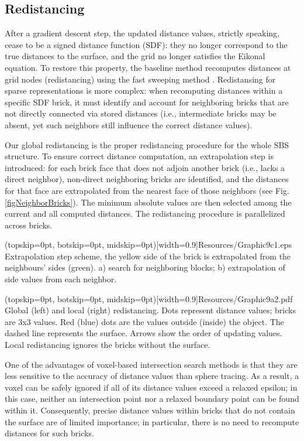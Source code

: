 \documentclass{ieeeaccess}
\begin{document}
\subsection{Redistancing}

After a gradient descent step, the updated distance values, strictly speaking, cease to be a signed distance function (SDF): they no longer correspond to the true distances to the surface, and the grid no longer satisfies the Eikonal equation. To restore this property, the baseline method recomputes distances at grid nodes (redistancing) using the fast sweeping method \cite{RedistFSM}. Redistansing for sparse representations is more complex: when recomputing distances within a specific SDF brick, it must identify and account for neighboring bricks that are not directly connected via stored distances (i.e., intermediate bricks may be absent, yet such neighbors still influence the correct distance values).

Our global redistancing is the proper redistancing procedure for the whole SBS structure. To ensure correct distance computation, an extrapolation step is introduced: for each brick face that does not adjoin another brick (i.e., lacks a direct neighbor), non-direct neighboring bricks are identified, and the distances for that face are extrapolated from the nearest face of those neighbors (see Fig. \ref{figNeighborBricks}). The minimum absolute values are then selected among the current and all computed distances. The redistancing procedure is parallelized across bricks.

\Figure[t](topskip=0pt, botskip=0pt, midskip=0pt)[width=0.9\linewidth]{Resources/Graphic9c1.eps} {
    Extrapolation step scheme, the yellow side of the brick is extrapolated from the neighbours' sides (green). a) search for neighboring blocks; b) extrapolation of side values from each neighbor.  
    \label{figNeighborBricks}
}

\Figure[h](topskip=0pt, botskip=0pt, midskip=0pt)[width=0.9\linewidth]{Resources/Graphic9a2.pdf} {
    Global (left) and local (right) redistancing. Dots represent distance values; bricks are 3x3 values. Red (blue) dots are the values outside (inside) the object. The dashed line represents the surface. Arrows show the order of updating values. Local redistancing ignores the bricks without the surface. \label{figRedistTypes}
}

One of the advantages of voxel-based intersection search methods is that they are less sensitive to the accuracy of distance values than sphere tracing. As a result, a voxel can be safely ignored if all of its distance values exceed a relaxed epsilon; in this case, neither an intersection point nor a relaxed boundary point can be found within it. Consequently, precise distance values within bricks that do not contain the surface are of limited importance; in particular, there is no need to recompute distances for such bricks.
\end{document}
